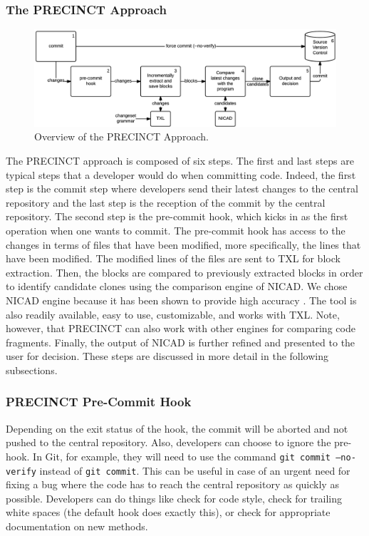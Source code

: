 \subsubsection{The PRECINCT Approach}
\label{sec:The PRECINCT Approach}

\begin{figure}
  \centering
    \includegraphics[width=\textwidth]{media/approach.png}
    \caption{ Overview of the PRECINCT Approach.\label{fig:precinct-approach}}
\end{figure}

The PRECINCT approach is composed of six steps.
The first and last steps are typical steps that a developer would do when committing code.
Indeed, the first step is the commit step where developers send their latest changes to the central repository and the last step is the reception of the commit by the central repository.
The second step is the pre-commit hook, which kicks in as the first operation when one wants to commit.
The pre-commit hook has access to the changes in terms of files that have been modified, more specifically, the lines that have been modified. The modified lines of the files are sent to TXL\cite{Cordy2006a} for block extraction. Then, the blocks are compared to previously extracted blocks in order to identify candidate clones using the comparison engine of NICAD\cite{Cordy2011}. We chose NICAD engine because it has been shown to provide high accuracy \cite{Cordy2011}. The tool is also readily available, easy to use, customizable, and works with TXL. Note, however, that PRECINCT can also work with other engines for comparing code fragments.
Finally, the output of NICAD is further refined and presented to the user for decision.
These steps are discussed in more detail in the following subsections.

\subsubsection{PRECINCT Pre-Commit Hook}
\label{sub:Pre-Commit Hook}

Depending on the exit status of the hook, the commit will be aborted and not pushed to the central repository.
Also, developers can choose to ignore the pre-hook. In Git, for example, they will need to use the command \texttt{git commit --no-verify} instead of \texttt{git commit}.
This can be useful in case of an urgent need for fixing a bug where the code has to reach the central repository as quickly as possible.
Developers can do things like check for code style, check for trailing white spaces (the default hook does exactly this), or check for appropriate documentation on new methods.

